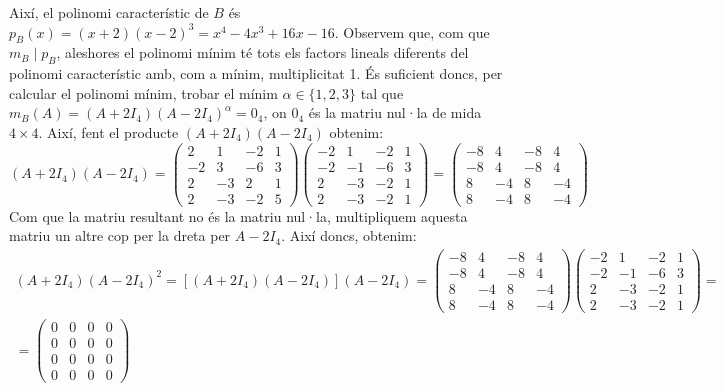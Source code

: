 \documentclass[11pt,a4paper]{article}
\begin{document}
        Així, el polinomi característic de $B$ és $p_B(x)=(x+2)(x-2)^3=x^4-4x^3+16x-16$. Observem que, com que $m_B\mid p_B$, aleshores el polinomi mínim té tots els factors lineals diferents del polinomi característic amb, com a mínim, multiplicitat 1. És suficient doncs, per calcular el polinomi mínim, trobar el mínim $\alpha\in\{1,2,3\}$ tal que $m_B(A)=(A+2I_4)(A-2I_4)^\alpha=0_4$, on $0_4$ és la matriu nul·la de mida $4\times4$. Així, fent el producte $(A+2I_4)(A-2I_4)$ obtenim:
        \begin{equation*}
            (A+2I_4)(A-2I_4)=\begin{pmatrix}
        2 & 1 & -2 & 1\\
        -2 & 3 & -6 & 3\\
        2 & -3 & 2 & 1\\
        2 & -3 & -2 & 5
        \end{pmatrix}\begin{pmatrix}
        -2 & 1 & -2 & 1\\
        -2 & -1 & -6 & 3\\
        2 & -3 & -2 & 1\\
        2 & -3 & -2 & 1
        \end{pmatrix}=\begin{pmatrix}
        -8 & 4 & -8 & 4\\
        -8 & 4 & -8 & 4\\
        8 & -4 & 8 & -4\\
        8 & -4 & 8 & -4
        \end{pmatrix}
        \end{equation*}
        Com que la matriu resultant no és la matriu nul·la, multipliquem aquesta matriu un altre cop per la dreta per $A-2I_4$. Així doncs, obtenim:
        \begin{multline*}
            (A+2I_4)(A-2I_4)^2=[(A+2I_4)(A-2I_4)](A-2I_4)=\begin{pmatrix}
        -8 & 4 & -8 & 4\\
        -8 & 4 & -8 & 4\\
        8 & -4 & 8 & -4\\
        8 & -4 & 8 & -4
        \end{pmatrix}\begin{pmatrix}
        -2 & 1 & -2 & 1\\
        -2 & -1 & -6 & 3\\
        2 & -3 & -2 & 1\\
        2 & -3 & -2 & 1
        \end{pmatrix}=\\=\begin{pmatrix}
            0 & 0 & 0 & 0\\
            0 & 0 & 0 & 0\\
            0 & 0 & 0 & 0\\
            0 & 0 & 0 & 0
        \end{pmatrix}
        \end{multline*}
\end{document}
